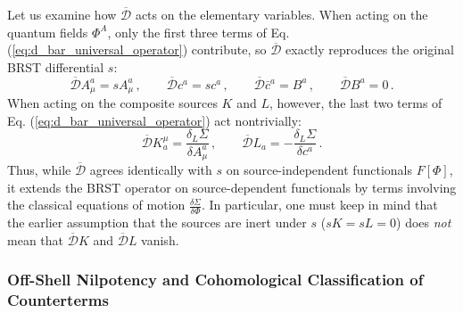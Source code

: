 Let us examine how \(\overline{\mathcal{D}}\) acts on the elementary variables. When acting on the quantum fields \(\Phi^A\), only the first three terms of Eq. (\ref{eq:d_bar_universal_operator}) contribute, so \(\overline{\mathcal{D}}\) exactly reproduces the original BRST differential \(s\):
\begin{equation} \label{eq:d_bar_on_fields}
    \overline{\mathcal{D}} A_\mu^a = sA_\mu^a \, , \qquad \overline{\mathcal{D}} c^a = sc^a \, , \qquad \overline{\mathcal{D}} \bar{c}^a = B^a \, , \qquad \overline{\mathcal{D}} B^a = 0 \, .
\end{equation}
When acting on the composite sources \(K\) and \(L\), however, the last two terms of Eq. (\ref{eq:d_bar_universal_operator}) act nontrivially:
\begin{equation} \label{eq:d_bar_on_sources}
    \overline{\mathcal{D}} K_a^\mu = \frac{\delta_L \Sigma}{\delta A_\mu^a} \, , \qquad \overline{\mathcal{D}} L_a = -\frac{\delta_L \Sigma}{\delta c^a} \, .
\end{equation}
Thus, while \(\overline{\mathcal{D}}\) agrees identically with \(s\) on source-independent functionals \(F[\Phi]\), it extends the BRST operator on source-dependent functionals by terms involving the classical equations of motion \(\frac{\delta \Sigma}{\delta \Phi}\). In particular, one must keep in mind that the earlier assumption that the sources are inert under \(s\) (\(sK = sL = 0\)) does \textit{not} mean that \(\overline{\mathcal{D}}K\) and \(\overline{\mathcal{D}}L\) vanish.

\subsubsection{Off-Shell Nilpotency and Cohomological Classification of Counterterms}

